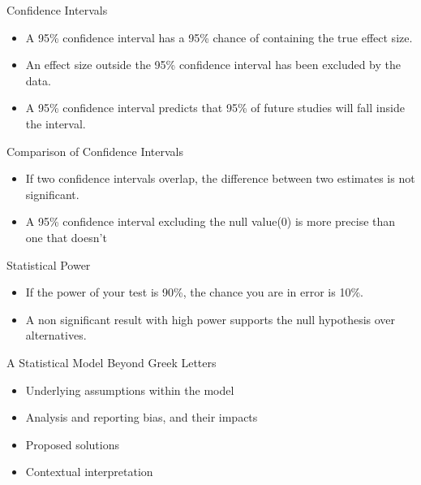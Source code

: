 \documentclass[aspectratio=169, 12pt]{beamer}
\begin{document}
\begin{frame}{Confidence Intervals} %
\begin{itemize}
    \item A 95\% confidence interval has a 95\% chance of containing the true effect size.
    \vspace{0.5cm}
    \item An effect size outside the 95\% confidence interval has been excluded by the data.
    \vspace{0.5cm}
    \item A 95\% confidence interval predicts that 95\% of future studies will fall inside the interval.
\end{itemize}
\end{frame}

\begin{frame}{Comparison of Confidence Intervals} %
\begin{itemize}
    \item If two confidence intervals overlap, the difference between two estimates is not significant.
    \vspace{0.5cm}
    \item A 95\% confidence interval excluding the null value(0) is more precise than one that doesn't
\end{itemize}
\end{frame}

\begin{frame}{Statistical Power} %
\begin{itemize}
    \item If the power of your test is 90\%, the chance you are in error is 10\%.
    \vspace{0.5cm}
    \item A non significant result with high power supports the null hypothesis over alternatives.
\end{itemize}
\end{frame}

\begin{frame}{A Statistical Model Beyond Greek Letters}
\begin{itemize}
    \item Underlying assumptions within the model
    \vspace{0.5cm}
    \item Analysis and reporting bias, and their impacts
    \vspace{0.5cm}
    \item Proposed solutions
    \vspace{0.5cm}
    \item Contextual interpretation
\end{itemize}
\end{frame}
\end{document}
